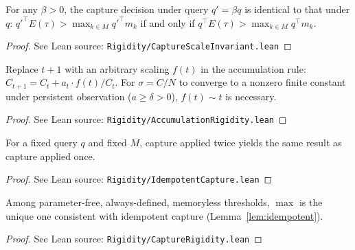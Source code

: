 \begin{corollary}
\label{cor:capture_scale_invariant}
\leanok
{}
For any $\beta > 0$, the capture decision under query $q' = \beta q$ is identical to that under $q$: $q'^\top E(\tau) > \max_{k \in M} q'^\top m_k$ if and only if $q^\top E(\tau) > \max_{k \in M} q^\top m_k$.
\end{corollary}

\begin{proof}
\leanok
{}
See Lean source: \texttt{Rigidity/CaptureScaleInvariant.lean}
\end{proof}

\begin{proposition}
\label{prop:rigidity}
\leanok
{}
Replace $t+1$ with an arbitrary scaling $f(t)$ in the accumulation rule: $C_{t+1} = C_t + a_t \cdot f(t)/C_t$. For $\sigma = C/N$ to converge to a nonzero finite constant under persistent observation ($a \geq \delta > 0$), $f(t) \sim t$ is necessary.
\end{proposition}

\begin{proof}
\leanok
{}
See Lean source: \texttt{Rigidity/AccumulationRigidity.lean}
\end{proof}

\begin{lemma}
\label{lem:idempotent}
\leanok
{}
For a fixed query $q$ and fixed $M$, capture applied twice yields the same result as capture applied once.
\end{lemma}

\begin{proof}
\leanok
{}
See Lean source: \texttt{Rigidity/IdempotentCapture.lean}
\end{proof}

\begin{proposition}
\label{prop:capture_rigidity}
\leanok
{}
Among parameter-free, always-defined, memoryless thresholds, $\max$ is the unique one consistent with idempotent capture (Lemma~\ref{lem:idempotent}).
\end{proposition}

\begin{proof}
\leanok
{}
See Lean source: \texttt{Rigidity/CaptureRigidity.lean}
\end{proof}

